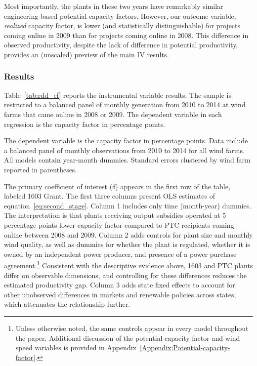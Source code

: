 \documentclass[12pt]{article}
\begin{document}
Most importantly, the plants in these two years have remarkably similar engineering-based potential capacity factors. However, our outcome variable, \textit{realized} capacity factor, is lower (and statistically distinguishable) for projects coming online in 2009 than for projects coming online in 2008. This difference in observed productivity, despite the lack of difference in potential productivity, provides an (unscaled) preview of the main IV results. 

\subsubsection*{Results \label{sec:results:rd}}

Table~\ref{tab:rdd_cf} reports the instrumental variable results. The sample is restricted to a balanced panel of monthly generation from 2010 to 2014 at wind farms that came online in 2008 or 2009. The dependent variable in each regression is the capacity factor in percentage points.

\begin{table}[h]
\caption{Instrumental Variables Estimates \label{tab:rdd_cf}}
\begin{center} {\footnotesize{}} \end{center}
\footnotesize
The dependent variable is the capacity factor in percentage points. Data include a balanced panel of monthly observations from 2010 to 2014 for all wind farms. All models contain year-month dummies. Standard errors clustered by wind farm reported in parentheses.
\end{table}

The primary coefficient of interest ($\delta$) appears in the first row of the table, labeled 1603 Grant. The first three columns present OLS estimates of equation~\ref{eq:second_stage}. Column 1 includes only time (month-year) dummies. The interpretation is that plants receiving output subsidies operated at 5 percentage points lower capacity factor compared to PTC recipients coming online between 2008 and 2009. Column 2 adds controls for plant size and monthly wind quality, as well as dummies for whether the plant is regulated, whether it is owned by an independent power producer, and presence of a power purchase agreement.\footnote{Unless otherwise noted, the same controls appear in every model throughout the paper. Additional discussion of the potential capacity factor and wind speed variables is provided in Appendix~\ref{Appendix:Potential-capacity-factor}.} Consistent with the descriptive evidence above, 1603 and PTC plants differ on observable dimensions, and controlling for these differences reduces the estimated productivity gap. Column 3 adds state fixed effects to account for other unobserved differences in markets and renewable policies across states, which attenuates the relationship further.
\end{document}
